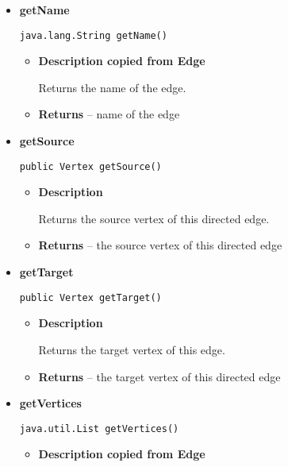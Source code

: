 {{{{{{{{{{{{{{{\begin{itemize}
{\begin{itemize}
{Returns the label of the edge.
}
\item{{\bf  Returns} -- 
label of the edge 
}%
\end{itemize}
}%
\item{ 
{\bf  getName}\\
\begin{lstlisting}[frame=none]
java.lang.String getName()\end{lstlisting} %
\begin{itemize}
\item{
{\bf  Description copied from Edge{\small {}} }

Returns the name of the edge.
}
\item{{\bf  Returns} -- 
name of the edge 
}%
\end{itemize}
}%
\item{ 
{\bf  getSource}\\
\begin{lstlisting}[frame=none]
public Vertex getSource()\end{lstlisting} %
\begin{itemize}
\item{
{\bf  Description}

Returns the source vertex of this directed edge.
}
\item{{\bf  Returns} -- 
the source vertex of this directed edge 
}%
\end{itemize}
}%
\item{ 
{\bf  getTarget}\\
\begin{lstlisting}[frame=none]
public Vertex getTarget()\end{lstlisting} %
\begin{itemize}
\item{
{\bf  Description}

Returns the target vertex of this edge.
}
\item{{\bf  Returns} -- 
the target vertex of this directed edge 
}%
\end{itemize}
}%
\item{ 
{\bf  getVertices}\\
\begin{lstlisting}[frame=none]
java.util.List getVertices()\end{lstlisting} %
\begin{itemize}
\item{
{\bf  Description copied from Edge{\small {}} }

}
\end{itemize}}
\end{itemize}}}}}}}}}}}}}}}}
